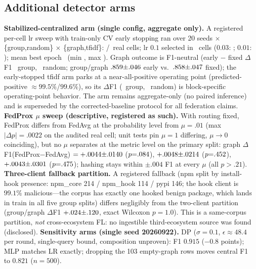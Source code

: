 \documentclass[sigconf,nonacm]{acmart}
\begin{document}
\subsection{Additional detector arms}
\textbf{Stabilized-centralized arm (single config, aggregate only).} A
registered per-cell lr sweep with train-only CV early stopping ran over
20 seeds $\times$ \{group,random\} $\times$ \{graph,tfidf\}:
\pmStabCells/\pmStabCells\ real cells; lr $0.1$ selected in
\pmStabLrZeroOne\ cells ($0.03$: \pmStabLrZeroThree; $0.01$:
\pmStabLrZeroZeroOne); mean best epoch \pmStabEpochsMean\ (min
\pmStabEpochsMin, max \pmStabEpochsMax). Graph outcome is F1-neutral
(early $-$ fixed $\Delta$F1 \pmStabDfGroupGraph\ group,
\pmStabDfRandomGraph\ random; group/graph
$.859{\pm}.046$ early vs.\
$.858{\pm}.047$ fixed); the
early-stopped tfidf arm parks at a near-all-positive operating point
(predicted-positive ${\approx}99.5\%$/$99.6\%$), so its
$\Delta$F1 (\pmStabDfGroupTfidf\ group, \pmStabDfRandomTfidf\ random) is
block-specific operating-point behavior. The arm remains aggregate-only
(no paired inference) and is superseded by the corrected-baseline
protocol for all federation claims.
\textbf{FedProx $\mu$ sweep (descriptive, registered as such).} With
routing fixed, FedProx differs from FedAvg at the probability level from
$\mu{=}.01$ (max $|\Delta p|{=}.0022$ on the audited real cell; unit
tests pin $\mu{=}1$ differing, $\mu{\to}0$ coinciding), but no $\mu$
separates at the metric level on the primary split: graph
$\Delta$F1(FedProx$-$FedAvg) $= +.0044{\pm}
.0140$ ($p{=}.084$),
$+.0048{\pm}.0214$
($p{=}.452$), $+.0043{\pm}
.0301$ ($p{=}.475$); hashing stays within
$\pm.004$ F1 at every $\mu$ (all $p{>}.21$).
\textbf{Three-client fallback partition.} A registered fallback (npm
split by install-hook presence: npm\_core 214 / npm\_hook 114 / pypi 146;
the hook client is $99.1\%$ malicious---the corpus has exactly one hooked
benign package, which lands in train in all five group splits) differs
negligibly from the two-client partition (group/graph $\Delta$F1
$+.024{\pm}.120$, exact Wilcoxon $p{=}1.0$). This is a
same-corpus partition, \emph{not} cross-ecosystem FL: no ingestible
third-ecosystem source was found (disclosed).
\textbf{Sensitivity arms (single seed 20260922).} DP
($\sigma{=}0.1$, $\epsilon\!\approx\!48.4$ per round, single-query bound,
composition unproven): F1 $0.915$ ($-0.8$ points); MLP matches LR exactly;
dropping the 103 empty-graph rows moves central F1 to $0.821$ ($n{=}500$).
\end{document}
